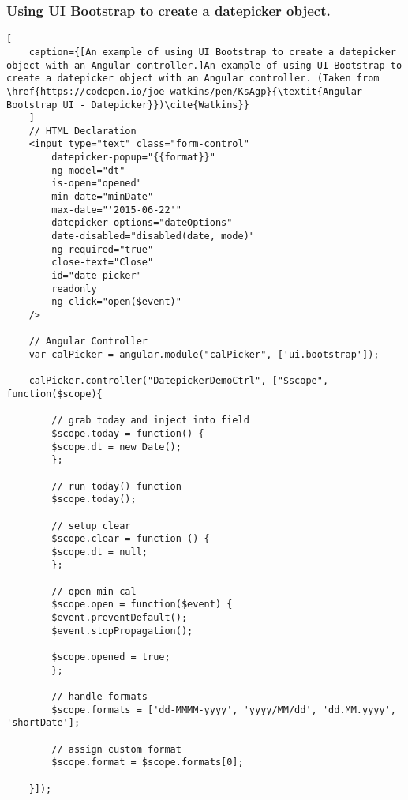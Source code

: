\subsubsection{Using UI Bootstrap to create a datepicker object.}
\label{sec:ui_bootstrap}
\begin{lstlisting}[
    caption={[An example of using UI Bootstrap to create a datepicker object with an Angular controller.]An example of using UI Bootstrap to create a datepicker object with an Angular controller. (Taken from \href{https://codepen.io/joe-watkins/pen/KsAgp}{\textit{Angular - Bootstrap UI - Datepicker}})\cite{Watkins}}
    ]
    // HTML Declaration
    <input type="text" class="form-control" 
        datepicker-popup="{{format}}" 
        ng-model="dt" 
        is-open="opened" 
        min-date="minDate" 
        max-date="'2015-06-22'"
        datepicker-options="dateOptions" 
        date-disabled="disabled(date, mode)" 
        ng-required="true" 
        close-text="Close" 
        id="date-picker" 
        readonly
        ng-click="open($event)"
    />
    
    // Angular Controller
    var calPicker = angular.module("calPicker", ['ui.bootstrap']);
    
    calPicker.controller("DatepickerDemoCtrl", ["$scope", function($scope){
        
        // grab today and inject into field
        $scope.today = function() {
        $scope.dt = new Date();
        };
        
        // run today() function
        $scope.today();
    
        // setup clear
        $scope.clear = function () {
        $scope.dt = null;
        };
    
        // open min-cal
        $scope.open = function($event) {
        $event.preventDefault();
        $event.stopPropagation();
    
        $scope.opened = true;
        };
        
        // handle formats
        $scope.formats = ['dd-MMMM-yyyy', 'yyyy/MM/dd', 'dd.MM.yyyy', 'shortDate'];
        
        // assign custom format
        $scope.format = $scope.formats[0];
        
    }]);
    \end{lstlisting}